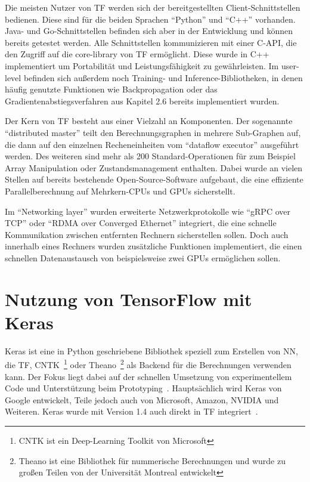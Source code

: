 Die meisten Nutzer von \gls{TF} werden sich der bereitgestellten Client-Schnittstellen bedienen. Diese sind für die beiden Sprachen "`Python"' und "`C++"' vorhanden. Java- und Go-Schnittstellen befinden sich aber in der Entwicklung und können bereits getestet werden. Alle Schnittstellen kommunizieren mit einer C-\gls{API}, die den Zugriff auf die core-library von \gls{TF} ermöglicht. Diese wurde in C++ implementiert um Portabilität und Leistungsfähigkeit zu gewährleisten. Im user-level befinden sich außerdem noch Training- und Inference-Bibliotheken, in denen häufig genutzte Funktionen wie Backpropagation oder das Gradientenabstiegsverfahren aus
Kapitel 2.6 bereits implementiert wurden.

Der Kern von \gls{TF} besteht aus einer Vielzahl an Komponenten. Der sogenannte "`distributed master"' teilt den Berechnungsgraphen in mehrere Sub-Graphen auf, die dann auf den einzelnen Recheneinheiten vom "`dataflow executor"' ausgeführt werden. Des weiteren sind mehr als 200 Standard-Operationen für zum Beispiel Array Manipulation oder Zustandsmanagement enthalten. Dabei wurde an vielen Stellen auf bereits bestehende Open-Source-Software aufgebaut, die eine effiziente Parallelberechnung auf Mehrkern-CPUs und GPUs sicherstellt.

Im "`Networking layer"' wurden erweiterte Netzwerkprotokolle wie "`gRPC over TCP"' oder "`RDMA over Converged Ethernet"' integriert, die eine schnelle Kommunikation zwischen entfernten Rechnern sicherstellen sollen. Doch auch innerhalb eines Rechners wurden zusätzliche Funktionen implementiert, die einen schnellen Datenaustausch von beispielsweise zwei GPUs ermöglichen sollen.

\section{Nutzung von TensorFlow mit Keras}

Keras ist eine in Python geschriebene Bibliothek speziell zum Erstellen von \gls{NN}, die \gls{TF}, CNTK~\footnote{CNTK ist ein Deep-Learning Toolkit von Microsoft} oder Theano~\footnote{Theano ist eine Bibliothek für nummerische Berechnungen und wurde zu großen Teilen von der Universität Montreal entwickelt} als Backend für die Berechnungen verwenden kann. Der Fokus liegt dabei auf der schnellen Umsetzung von experimentellem Code und Unterstützung beim Prototyping~\cite{keras}. Hauptsächlich wird Keras von Google entwickelt, Teile jedoch auch von Microsoft, Amazon, NVIDIA und Weiteren. Keras wurde mit Version 1.4 auch direkt in \gls{TF} integriert~\cite{tfRelease}.

